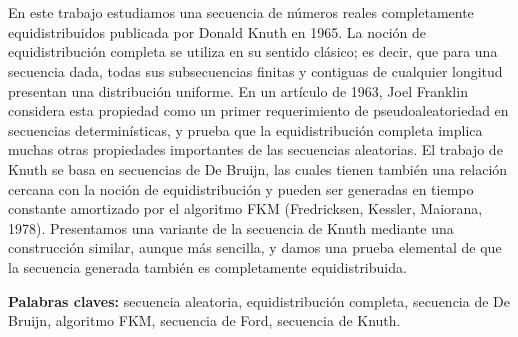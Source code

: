\chapter*{\runtitulo}

\noindent En este trabajo estudiamos una secuencia de números reales completamente equidistribuidos publicada por Donald Knuth en 1965. La noción de equidistribución completa se utiliza en su sentido clásico; es decir, que para una secuencia dada, todas sus subsecuencias finitas y contiguas de cualquier longitud presentan una distribución uniforme. En un artículo de 1963, Joel Franklin considera esta propiedad como un primer requerimiento de pseudoaleatoriedad en secuencias determinísticas, y prueba que la equidistribución completa implica muchas otras propiedades importantes de las secuencias aleatorias. El trabajo de Knuth se basa en secuencias de De Bruijn, las cuales tienen también una relación cercana con la noción de equidistribución y pueden ser generadas en tiempo constante amortizado por el algoritmo FKM (Fredricksen, Kessler, Maiorana, 1978). Presentamos una variante de la secuencia de Knuth mediante una construcción similar, aunque más sencilla, y damos una prueba elemental de que la secuencia generada también es completamente equidistribuida.

\bigskip

\noindent\textbf{Palabras claves:} secuencia aleatoria, equidistribución completa, secuencia de De Bruijn, algoritmo FKM, secuencia de Ford, secuencia de Knuth.
